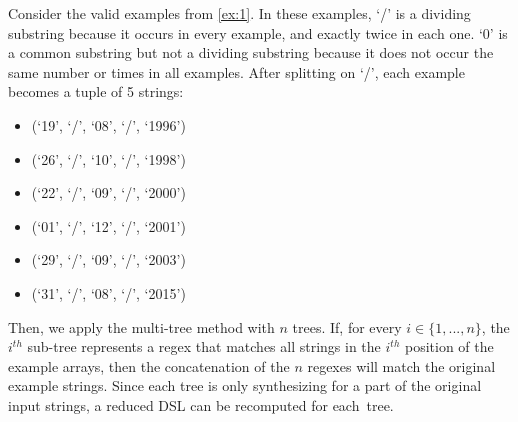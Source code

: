 \begin{example}\label{ex:splitting}
Consider the valid examples from \autoref{ex:1}.
%
In these examples, `/' is a dividing substring because it occurs in every example, and exactly twice in each one. `0' is a common substring but not a dividing substring because it does not occur the same number or times in all examples. After splitting on `/', each example becomes a tuple of 5 strings:

\begin{multicols}{3}
    \begin{itemize}[label={}]
    \item (`19', `/', `08', `/', `1996')
    \item (`26', `/', `10', `/', `1998')
    \item (`22', `/', `09', `/', `2000')
    \item (`01', `/', `12', `/', `2001')
    \item (`29', `/', `09', `/', `2003')
    \item (`31', `/', `08', `/', `2015')
    \end{itemize}
\end{multicols}
\end{example}
%
\noindent
Then, we apply the multi-tree method with \(n\) trees. If, for every \(i \in \{1, ..., n\}\), the \(i^{th}\) sub-tree represents a regex that matches all strings in the \(i^{th}\) position of the example arrays, then the concatenation of the \(n\) regexes will match the original example strings.
%
Since each tree is only synthesizing for a part of the original input strings, a reduced DSL can be recomputed for each~tree. %

